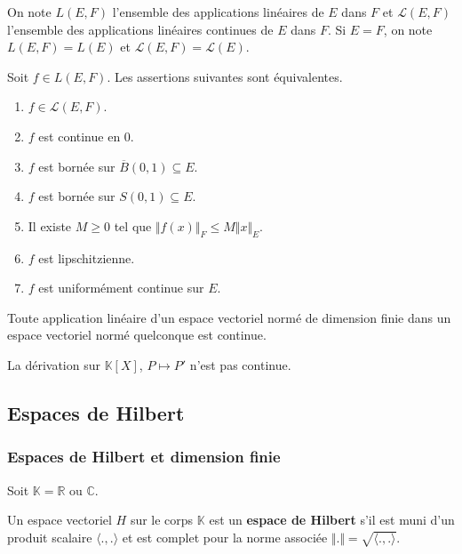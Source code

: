   \begin{notation}
    On note $L(E,F)$ l'ensemble des applications linéaires de $E$ dans $F$ et $\mathcal{L}(E,F)$ l'ensemble des applications linéaires continues de $E$ dans $F$. Si $E = F$, on note $L(E,F) = L(E)$ et $\mathcal{L}(E,F) = \mathcal{L}(E)$.
  \end{notation}

  \begin{theorem}
    Soit $f \in L(E,F)$. Les assertions suivantes sont équivalentes.
    \begin{enumerate}[label={\bfseries(\roman*)}]
      \item $f \in \mathcal{L}(E,F)$.
      \item $f$ est continue en $0$.
      \item $f$ est bornée sur $\overline{B}(0,1) \subseteq E$.
      \item $f$ est bornée sur $S(0,1) \subseteq E$.
      \item Il existe $M \geq 0$ tel que $\Vert f(x) \Vert_F \leq M \Vert x \Vert_E$.
      \item $f$ est lipschitzienne.
      \item $f$ est uniformément continue sur $E$.
    \end{enumerate}
  \end{theorem}

  \begin{proposition}
    Toute application linéaire d'un espace vectoriel normé de dimension finie dans un espace vectoriel normé quelconque est continue.
  \end{proposition}

  \begin{cexample}
    La dérivation sur $\mathbb{K}[X]$, $P \mapsto P'$ n'est pas continue.
  \end{cexample}

  \subsection{Espaces de Hilbert}

  \subsubsection{Espaces de Hilbert et dimension finie}


  Soit $\mathbb{K} = \mathbb{R}$ ou $\mathbb{C}$.

  \begin{definition}
    Un espace vectoriel $H$ sur le corps $\mathbb{K}$ est un \textbf{espace de Hilbert} s'il est muni d'un produit scalaire $\langle . , . \rangle$ et est complet pour la norme associée $\Vert . \Vert = \sqrt{\langle . , . \rangle}$.
  \end{definition}

